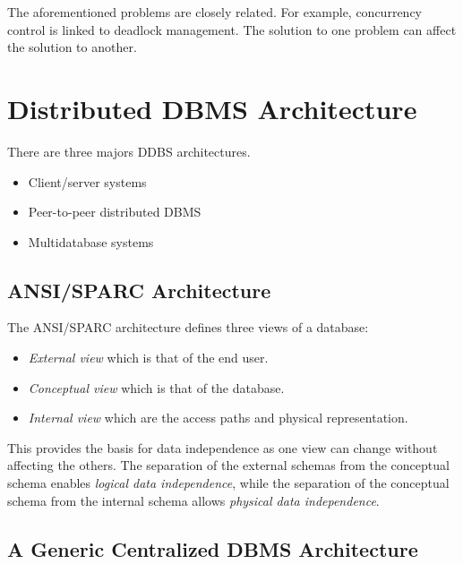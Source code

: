 \documentclass[12pt]{article}
\begin{document}
The aforementioned problems are closely related. For example, concurrency control is linked to deadlock management. The solution to one problem can affect the solution to another.

\section{Distributed DBMS Architecture}

There are three majors DDBS architectures.
\begin{itemize}
	\item Client/server systems
	\item Peer-to-peer distributed DBMS
	\item Multidatabase systems
\end{itemize}

\subsection{ANSI/SPARC Architecture}

The ANSI/SPARC architecture defines three views of a database:
\begin{itemize}
	\item \textit{External view} which is that of the end user.
	\item \textit{Conceptual view} which is that of the database.
	\item \textit{Internal view} which are the access paths and physical representation.
\end{itemize}

This provides the basis for data independence as one view can change without affecting the others. The separation of the external schemas from the conceptual schema enables \textit{logical data independence}, while the separation of the conceptual schema from the internal schema allows \textit{physical data independence}.

\subsection{A Generic Centralized DBMS Architecture}
\end{document}
